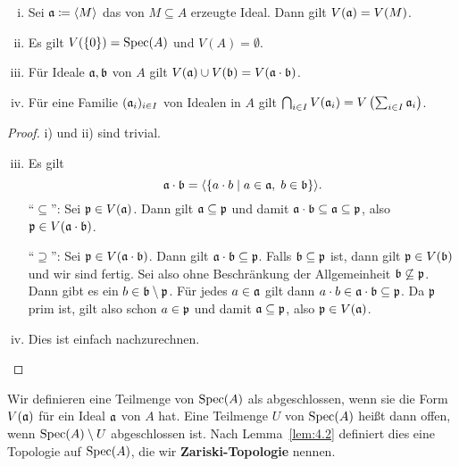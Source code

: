 \begin{lem}
\label{lem:4.2}
	\begin{enumerate}[i)]
		\item Sei $\mathfrak{a}\coloneqq \langle M \rangle$ das von $M\subseteq A$ erzeugte Ideal. Dann gilt $V(\mathfrak{a}) = V(M)$.
		\item Es gilt $V(\{0\}) = \operatorname{Spec}(A)$ und $V(A) = \emptyset$.
		\item Für Ideale $\mathfrak{a},\mathfrak{b}$ von $A$ gilt $V(\mathfrak{a}) \cup V(\mathfrak{b}) = V(\mathfrak{a} \cdot \mathfrak{b})$.
		\item Für eine Familie $(\mathfrak{a}_i)_{i\in I}$ von Idealen in $A$ gilt $\bigcap_{i\in I}V(\mathfrak{a}_i) = V\left(\sum_{i \in I} \mathfrak{a}_i\right)$.
	\end{enumerate}
	\begin{proof}
		i) und ii) sind trivial.
		\begin{enumerate}[i)]
		\setcounter{enumi}{2}
		\item Es gilt
		\[
			\mathfrak{a} \cdot \mathfrak{b} = \langle \{a \cdot b \mid a \in \mathfrak{a},\; b \in \mathfrak{b}\} \rangle .
		\]
		\enquote{$\subseteq$}: Sei $\mathfrak{p} \in V(\mathfrak{a})$. Dann gilt $\mathfrak{a} \subseteq \mathfrak{p}$ und damit $\mathfrak{a} \cdot \mathfrak{b} \subseteq \mathfrak{a} \subseteq \mathfrak{p}$, also $\mathfrak{p} \in V(\mathfrak{a} \cdot \mathfrak{b})$.

		\enquote{$\supseteq$}: Sei $\mathfrak{p} \in V(\mathfrak{a} \cdot \mathfrak{b})$. Dann gilt $\mathfrak{a} \cdot \mathfrak{b} \subseteq \mathfrak{p}$. Falls $\mathfrak{b} \subseteq \mathfrak{p}$ ist, dann gilt $\mathfrak{p} \in V(\mathfrak{b})$ und wir sind fertig. Sei also ohne Beschränkung der Allgemeinheit $\mathfrak{b} \not\subseteq \mathfrak{p}$. Dann gibt es ein $b \in \mathfrak{b} \setminus \mathfrak{p}$. Für jedes $a \in \mathfrak{a}$ gilt dann $a \cdot b \in \mathfrak{a} \cdot \mathfrak{b} \subseteq \mathfrak{p}$. Da $\mathfrak{p}$ prim ist, gilt also schon $a \in \mathfrak{p}$ und damit $\mathfrak{a} \subseteq \mathfrak{p}$, also $\mathfrak{p} \in V(\mathfrak{a})$.
		\item Dies ist einfach nachzurechnen.
		\end{enumerate}
	\end{proof}
\end{lem}

\begin{defn}
	Wir definieren eine Teilmenge von $\operatorname{Spec}(A)$ als abgeschlossen, wenn sie die Form $V(\mathfrak{a})$ für ein Ideal $\mathfrak{a}$ von $A$ hat. Eine Teilmenge $U$ von $\operatorname{Spec}(A)$ heißt dann offen, wenn $\operatorname{Spec}(A)\setminus U$ abgeschlossen ist. Nach Lemma~\ref{lem:4.2} definiert dies eine Topologie auf $\operatorname{Spec}(A)$, die wir \textbf{Zariski-Topologie} nennen.
\end{defn}

